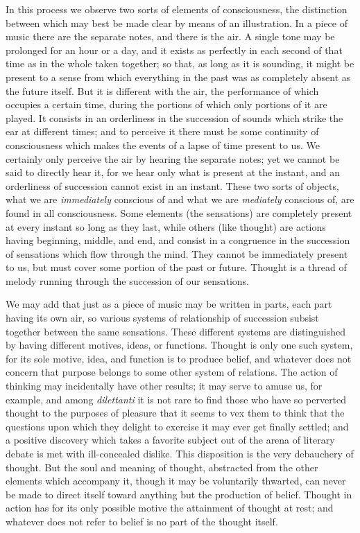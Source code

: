 \documentclass[]{article}
\begin{document}
In this process we observe two sorts of elements of consciousness, the distinction between which may best be made clear by means of an illustration. In a piece of music there are the separate notes, and there is the air. A single tone may be prolonged for an hour or a day, and it exists as perfectly in each second of that time as in the whole taken together; so that, as long as it is sounding, it might be present to a sense from which everything in the past was as completely absent as the future itself. But it is different with the air, the performance of which occupies a certain time, during the portions of which only portions of it are played. It consists in an orderliness in the succession of sounds which strike the ear at different times; and to perceive it there must be some continuity of consciousness which makes the events of a lapse of time present to us. We certainly only perceive the air by hearing the separate notes; yet we cannot be said to directly hear it, for we hear only what is present at the instant, and an orderliness of succession cannot exist in an instant. These two sorts of objects, what we are \emph{immediately} conscious of and what we are
\emph{mediately} conscious of, are found in all consciousness. Some elements (the sensations) are completely present at every instant so long as they last, while others (like thought) are actions having beginning, middle, and end, and consist in a congruence in the succession of sensations which flow through the  mind. They cannot be immediately present to us, but must cover some portion of the past or future. Thought is a thread of melody running through the succession of our sensations.


We may add that just as a piece of music may be written in parts, each part having its own air, so various systems of relationship of succession subsist together between the same sensations. These different systems are distinguished by having different motives, ideas, or functions. Thought is only one such system, for its sole motive, idea, and function is to produce belief, and whatever does not concern that purpose belongs to some other system of relations. The action of thinking may incidentally have other results; it may serve to amuse us, for example, and among \emph{dilettanti} it is not rare to find those who have so perverted thought to the purposes of pleasure that it seems to vex them to think that the questions upon which they delight to exercise it may ever get finally settled; and a positive discovery which takes a favorite subject out of the arena of literary debate is met with ill-concealed dislike. This disposition is the very debauchery of thought. But the soul and meaning of thought, abstracted from the other elements which accompany it, though it may be voluntarily thwarted, can never be made to direct itself toward anything but the production of belief. Thought in action has for its only possible motive the attainment of thought at rest; and whatever does not refer to belief is no part of the thought itself. 
\end{document}
